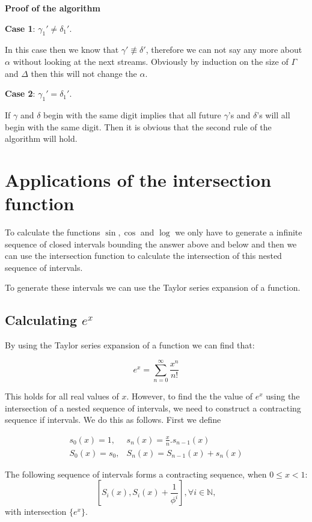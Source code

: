 \documentclass{cs4rep}
\begin{document}
{\bf Proof of the algorithm}

{\bf Case 1}: $\gamma_{1}' \neq \delta_{1}'$.

In this case then we know that $\gamma' \not\equiv \delta'$, therefore
we can not say any more about $\alpha$ without looking at the next
streams. Obviously by induction on the size of $\Gamma$ and $\Delta$
then this will not change the $\alpha$.

{\bf Case 2}: $\gamma_{1}' = \delta_{1}'$.

If $\gamma$ and $\delta$ begin with the same digit implies that all
future $\gamma$'s and $\delta$'s will all begin with the same digit.
Then it is obvious that the second rule of the algorithm will hold.




\section{Applications of the intersection function}
To calculate the functions $\sin, \cos$ and $\log$ we only have to
generate a infinite sequence of closed intervals bounding the answer
above and below and then we can use the intersection function to
calculate the intersection of this nested sequence of intervals.

To generate these intervals we can use the Taylor series expansion of
a function.

\subsection*{Calculating $e^{x}$}

By using the Taylor series expansion of a function we can find that:

\begin{equation}
e^{x} = \sum_{n=0}^{\infty} \frac{x^{n}}{n!} \label{eq:exp}
\end{equation}

This holds for all real values of $x$. However, to find the the value
of $e^{x}$ using the intersection of a nested sequence of intervals,
we need to construct a contracting sequence if intervals. We do this as follows. First we define

\[ \begin{array}{ll}
s_{0}(x) = 1, & s_{n}(x) = \frac{x}{n}.s_{n-1}(x) \\
S_{0}(x) = s_{0}, & S_{n}(x) = S_{n-1}(x) + s_{n}(x)
\end{array} \]

\begin{myprop}
  The following sequence of intervals forms a contracting sequence,
  when $ 0 \leq x < 1$:
\[ [S_{i}(x), S_{i}(x) + \frac{1}{\phi^{i}}], \forall i \in \mathbb{N}, \]
with intersection $\{ e^{x} \}$.
\end{myprop}
\end{document}
